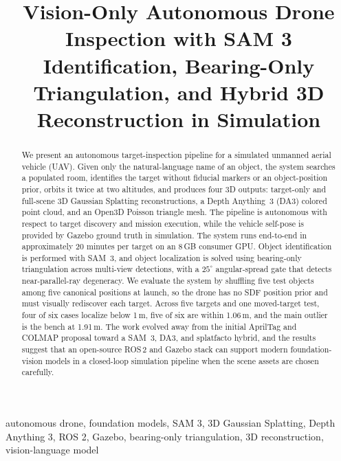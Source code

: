 \documentclass[conference]{IEEEtran}
\begin{document}
\title{Vision-Only Autonomous Drone Inspection with SAM 3 Identification, Bearing-Only Triangulation, and Hybrid 3D Reconstruction in Simulation}

\author{
}

\maketitle

\begin{abstract}
We present an autonomous target-inspection pipeline for a simulated
unmanned aerial vehicle (UAV). Given only the natural-language name
of an object, the system searches a populated room, identifies the
target without fiducial markers or an object-position prior, orbits
it twice at two altitudes, and produces four 3D outputs:
target-only and full-scene 3D Gaussian Splatting reconstructions, a
Depth Anything~3 (DA3) colored point cloud, and an Open3D Poisson
triangle mesh. The pipeline is autonomous with respect to target
discovery and mission execution, while the vehicle self-pose is
provided by Gazebo ground truth in simulation. The system runs
end-to-end in approximately 20 minutes per target on an 8\,GB
consumer GPU. Object identification is performed with SAM~3, and
object localization is solved using bearing-only triangulation
across multi-view detections, with a $25^{\circ}$ angular-spread
gate that detects near-parallel-ray degeneracy. We evaluate the
system by shuffling five test objects among five canonical
positions at launch, so the drone has no SDF position prior and
must visually rediscover each target. Across five targets and one
moved-target test, four of six cases localize below 1\,m, five of
six are within 1.06\,m, and the main outlier is the bench at
1.91\,m. The work evolved away from the initial AprilTag and COLMAP
proposal toward a SAM~3, DA3, and splatfacto hybrid, and the
results suggest that an open-source ROS\,2 and Gazebo stack can
support modern foundation-vision models in a closed-loop simulation
pipeline when the scene assets are chosen carefully.
\end{abstract}

\begin{IEEEkeywords}
autonomous drone, foundation models, SAM 3, 3D Gaussian Splatting,
Depth Anything 3, ROS 2, Gazebo, bearing-only triangulation,
3D reconstruction, vision-language model
\end{IEEEkeywords}
\end{document}

